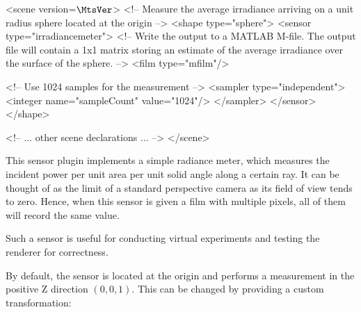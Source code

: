 \vspace{4mm}
\begin{xml}
<scene version=$\MtsVer$>
    <!-- Measure the average irradiance arriving on
         a unit radius sphere located at the origin -->
    <shape type="sphere">
        <sensor type="irradiancemeter">
            <!-- Write the output to a MATLAB M-file. The output file will
                 contain a 1x1 matrix storing an estimate of the average
                 irradiance over the surface of the sphere. -->
            <film type="mfilm"/>

            <!-- Use 1024 samples for the measurement -->
            <sampler type="independent">
                <integer name="sampleCount" value="1024"/>
            </sampler>
        </sensor>
    </shape>

    <!-- ... other scene declarations ... -->
</scene>
\end{xml}

This sensor plugin implements a simple radiance meter, which measures
the incident power per unit area per unit solid angle along a
certain ray. It can be thought of as the limit of a standard
perspective camera as its field of view tends to zero.
Hence, when this sensor is given a film with multiple pixels, all
of them will record the same value.

Such a sensor is useful for conducting virtual experiments and
testing the renderer for correctness.

By default, the sensor is located at the origin and performs
a measurement in the positive Z direction $(0,0,1)$. This can
be changed by providing a custom  transformation:

